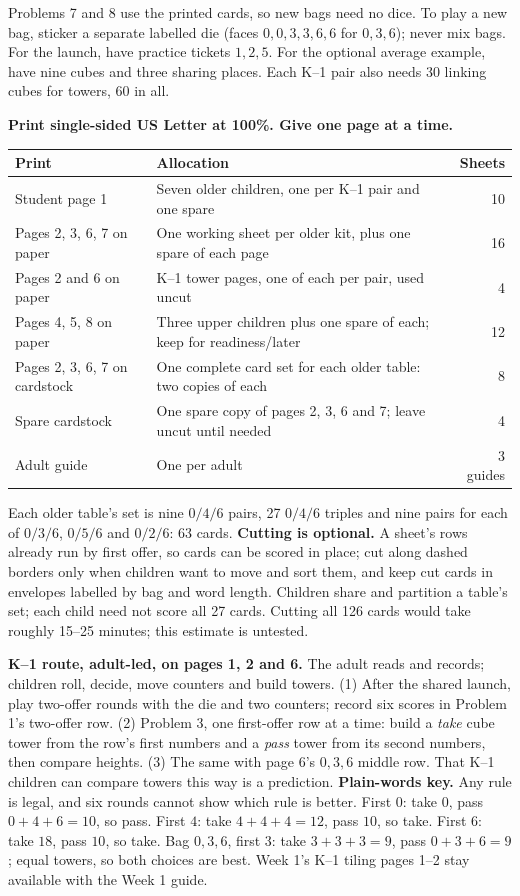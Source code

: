 \documentclass[11pt,letterpaper]{article}
\begin{document}
Problems 7 and 8 use the printed cards, so new bags need no dice. To play a
new bag, sticker a separate labelled die (faces $0,0,3,3,6,6$ for $0,3,6$);
never mix bags. For the launch, have practice tickets $1,2,5$. For the
optional average example, have nine cubes and three sharing places. Each K--1
pair also needs 30 linking cubes for towers, 60 in all.

\textbf{Print single-sided US Letter at 100\%. Give one page at a time.}
\begin{center}\small
\begin{tabular}{@{}p{1.6in}p{4.8in}r@{}}\toprule
Print & Allocation & Sheets \\\midrule
Student page 1 & Seven older children, one per K--1 pair and one spare & 10 \\
Pages 2, 3, 6, 7 on paper & One working sheet per older kit, plus one spare of each page & 16 \\
Pages 2 and 6 on paper & K--1 tower pages, one of each per pair, used uncut & 4 \\
Pages 4, 5, 8 on paper & Three upper children plus one spare of each; keep for readiness/later & 12 \\
Pages 2, 3, 6, 7 on cardstock & One complete card set for each older table: two copies of each & 8 \\
Spare cardstock & One spare copy of pages 2, 3, 6 and 7; leave uncut until needed & 4 \\
Adult guide & One per adult & 3 guides \\\bottomrule
\end{tabular}\end{center}
Each older table's set is nine $0/4/6$ pairs, 27 $0/4/6$ triples and nine
pairs for each of $0/3/6$, $0/5/6$ and $0/2/6$: 63 cards. \textbf{Cutting is
optional.} A sheet's rows already run by first offer, so cards can be scored in
place; cut along dashed borders only when children want to move and sort them,
and keep cut cards in envelopes labelled by bag and word length. Children share
and partition a table's set; each child need not score all 27 cards. Cutting
all 126 cards would take roughly 15--25 minutes; this estimate is untested.

\textbf{K--1 route, adult-led, on pages 1, 2 and 6.} The adult reads
and records; children roll, decide, move counters and build towers.
(1) After the shared launch, play two-offer rounds with the die and two
counters; record six scores in Problem 1's two-offer row. (2) Problem 3, one
first-offer row at a time: build a \emph{take} cube tower from the row's first
numbers and a \emph{pass} tower from its second numbers, then compare heights.
(3) The same with page 6's $0,3,6$ middle row. That K--1 children can compare
towers this way is a prediction. \textbf{Plain-words key.} Any rule is legal,
and six rounds cannot show which rule is better. First $0$: take $0$, pass
$0+4+6=10$, so pass. First $4$: take $4+4+4=12$, pass $10$, so take.
First $6$: take $18$, pass $10$, so take. Bag $0,3,6$, first $3$: take
$3+3+3=9$, pass $0+3+6=9$; equal towers, so both choices are best.
Week 1's K--1 tiling pages 1--2 stay available with the Week 1 guide.
\end{document}
